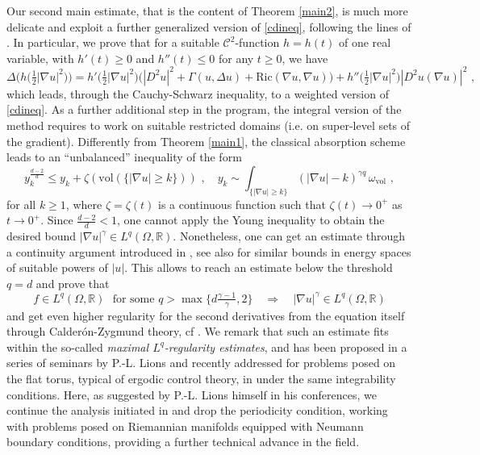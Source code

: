\documentclass[10pt, a4paper, reqno, oneside]{amsart}
\theoremstyle{plain}
\theoremstyle{definition}
\theoremstyle{plain}
\theoremstyle{definition}
\theoremstyle{plain}
\renewcommand{\=}{:=}
\begin{document}
Our second main estimate, that is the content of Theorem \ref{main2}, is much more delicate and exploit a further generalized version of \eqref{cdineq}, following the lines of \cite{CGell}. In particular, we prove that for a suitable $\mathcal{C}^2$-function $h=h(t)$ of one real variable, with $h'(t) \geq 0$ and $h''(t) \leq 0$ for any $t \geq 0$, we have
\begin{equation*}
\Delta \big(h\big(\tfrac12|\nabla u|^2\big)\big) = h'\big(\tfrac12|\nabla u|^2\big)\big( |D^2u|^2+ \Gamma(u,\Delta u) + \mathrm{Ric}(\nabla u,\nabla u)\big)+h''\big(\tfrac12|\nabla u|^2\big)|D^2u(\nabla u)|^2 \,\, , 
\end{equation*}
which leads, through the Cauchy-Schwarz inequality, to a weighted version of \eqref{cdineq}.
As a further additional step in the program, the integral version of the method requires to work on suitable restricted domains (i.e. on super-level sets of the gradient). Differently from Theorem \ref{main1}, the classical absorption scheme leads to an ``unbalanced'' inequality of the form
\[
y_k^{\frac{d-2}d} \leq y_k+\zeta(\mathrm{vol}(\{ |\nabla u| \geq k\})) \,\, , \quad y_k \sim \int_{\{|\nabla u|\geq k\}}(|\nabla u|-k)^{\gamma q}\,\omega_{\mathrm{vol}} \,\, ,
\]
for all $k \geq 1$, where $\zeta=\zeta(t)$ is a continuous function such that $\zeta(t) \to 0^+$ as $t \to 0^+$. Since ${\frac{d-2}d} <1$, one cannot apply the Young inequality to obtain the desired bound $|\nabla u|^\gamma \in L^q(\Omega,\mathbb{R})$. Nonetheless, one can get an estimate through a continuity argument introduced in \cite{CGell}, see also \cite{GMP14} for similar bounds in energy spaces of suitable powers of $|u|$. This allows to reach an estimate below the threshold $q=d$ and prove that
$$
f \in L^q(\Omega,\mathbb{R}) \,\, \text{ for some } q > \max\big\{d\tfrac{\gamma-1}{\gamma},2\big\} \quad \Longrightarrow \quad |\nabla u|^\gamma \in L^q(\Omega,\mathbb{R}) 
$$
and get even higher regularity for the second derivatives from the equation itself through Calder\'on-Zygmund theory, cf \cite{GT,PigolaSurvey,GunPig}. We remark that such an estimate fits within the so-called {\it maximal $L^q$-regularity estimates}, and has been proposed in a series of seminars by P.-L. Lions and recently addressed for problems posed on the flat torus, typical of ergodic control theory, in \cite{CGell} under the same integrability conditions. Here, as suggested by P.-L. Lions himself in his conferences, we continue the analysis initiated in \cite{CGell} and drop the periodicity condition, working with problems posed on Riemannian manifolds equipped with Neumann boundary conditions, providing a further technical advance in the field.
\end{document}

